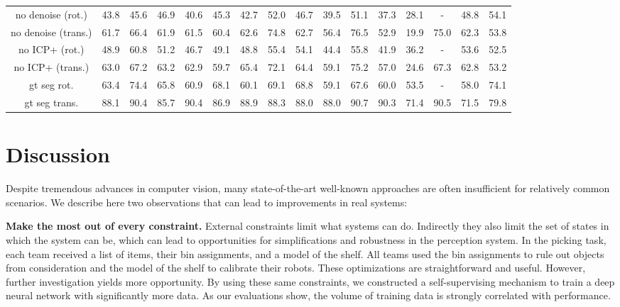 \documentclass[letterpaper, 10 pt, conference]{ieeeconf}  %
\newcommand{\myparagraph}[1]{\vspace{0.1in}\noindent\textbf{#1}}
\begin{document}
\begin{table*}[t]
\begin{tabular}{c|c|c|c|c|c|c|c|c|c|c|c|c|c|c|c}
    no denoise (rot.) & 43.8 & 45.6 & 46.9 & 40.6 & 45.3 & 42.7 & 52.0 & 46.7 & 39.5 & 51.1 & 37.3 & 28.1 & - & 48.8 & 54.1\\
    no denoise (trans.) & 61.7 & 66.4 & 61.9 & 61.5 & 60.4 & 62.6 & 74.8 & 62.7 & 56.4 & 76.5 & 52.9 & 19.9 & 75.0 & 62.3 & 53.8\\\hline
    no ICP+ (rot.) & 48.9 & 60.8 & 51.2 & 46.7 & 49.1 & 48.8 & 55.4 & 54.1 & 44.4 & 55.8 & 41.9 & 36.2 & - & 53.6 & 52.5\\
    no ICP+ (trans.) & 63.0 & 67.2 & 63.2 & 62.9 & 59.7 & 65.4 & 72.1 & 64.4 & 59.1 & 75.2 & 57.0 & 24.6 & 67.3 & 62.8 & 53.2\\\hline\hline
    
    gt seg rot. & 63.4 & 74.4 & 65.8 & 60.9 & 68.1 & 60.1 & 69.1 & 68.8 & 59.1 & 67.6 & 60.0 & 53.5 & - & 58.0 & 74.1 \\
    gt seg trans. & 88.1 & 90.4 & 85.7 & 90.4 & 86.9 & 88.9 & 88.3 & 88.0 & 88.0 & 90.7 & 90.3 & 71.4 & 90.5 & 71.5 & 79.8\\\hline
  \end{tabular}
  \label{table:pose}
  \vspace{-5mm}
\end{table*}

\section{Discussion}
Despite tremendous advances in computer vision, many state-of-the-art well-known approaches are often insufficient for relatively common scenarios. We describe here two observations that can lead to improvements in real systems:

\myparagraph{Make the most out of every constraint.}
External constraints limit what systems can do. Indirectly they also limit the set of states in which the system can be, which can lead to opportunities for simplifications and robustness in the perception system.
In the picking task, each team received a list of items, their bin assignments, and a model of the %
shelf. 
All teams used the bin assignments to rule out objects from consideration and the model of the shelf to calibrate their robots. These optimizations are straightforward and useful.
However, further investigation yields more opportunity. By using these same constraints, we constructed a self-supervising mechanism to train a deep neural network with significantly more data. As our evaluations show, the volume of training data is strongly correlated with performance.
\end{document}
